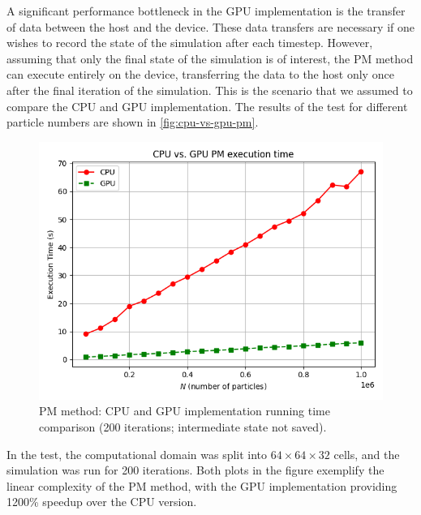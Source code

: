 A significant performance bottleneck in the GPU implementation is the transfer of data between the host and the device.
These data transfers are necessary if one wishes to record the state of the simulation after each timestep.
However, assuming that only the final state of the simulation is of interest, the PM method can execute entirely on the device, transferring the data to the host only once after the final iteration of the simulation.
This is the scenario that we assumed to compare the CPU and GPU implementation.
The results of the test for different particle numbers are shown in \autoref{fig:cpu-vs-gpu-pm}.
\begin{figure}[htp]
    \centering
    \includegraphics[scale=0.6]{chapters/pm-method/img/cpu-vs-gpu.png}
    \caption{PM method: CPU and GPU implementation running time comparison (200 iterations; intermediate state not saved).}
    \label{fig:cpu-vs-gpu-pm}
\end{figure}
In the test, the computational domain was split into $64\times 64 \times 32$ cells, and the simulation was run for 200 iterations.
Both plots in the figure exemplify the linear complexity of the PM method, with the GPU implementation providing 1200\% speedup over the CPU version.